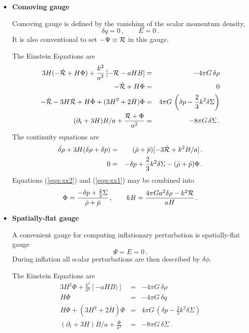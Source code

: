 \documentclass[12pt,letterpaper,rotate]{article}
\def\beq{\begin{equation}}
\def\eeq{\end{equation}}
\begin{document}
{\begin{itemize}
\item {\bf Comoving gauge}

Comoving gauge is defined by the vanishing of the scalar momentum density, 
\beq
\delta q = 0\, , \qquad E =0 \, .
\eeq
It is also conventional to set $- \Psi \equiv {\cal R}$ in this gauge.

The Einstein Equations are
\begin{eqnarray}
3H(- \dot {\cal R} + H \Phi) + \frac{k^2}{a^2} \left[ - {\cal R} - aH B \right] &=& - 4\pi G \, \delta \rho \\
- \dot {\cal R} + H \Phi &=& 0 \label{equ:xx1} \\
- \ddot {\cal R} - 3 H \dot {\cal R} + H \dot \Phi + (3 H^2 + 2 \dot H) \Phi &=& 4 \pi G\, \left( \delta p - \frac{2}{3} k^2 \delta \Sigma \right) \\
(\partial_t + 3 H) B/a + \frac{{\cal R} + \Phi}{a^2}&=& -8 \pi G\, \delta \Sigma\, .
\end{eqnarray}
The continuity equations are
\begin{eqnarray}
\label{equ:con}
\dot{\delta \rho} + 3 H (\delta \rho + \delta p) &=&  (\bar \rho + \bar p) [- 3 \dot {\cal R} + k^2  B/a] \, .\\
0 &=& - \delta p + \frac{2}{3} k^2 \delta \Sigma - (\bar \rho + \bar p) \Phi \, .\label{equ:xx2}
\end{eqnarray}
Equations (\ref{equ:xx2}) and (\ref{equ:xx1}) may be combined into
\beq
\Phi = \frac{- \delta p + \frac{2}{3} \Sigma}{\bar \rho + \bar p}\, , \qquad k B = \frac{4\pi G a^2 \delta \rho - k^2 {\cal R}}{a H}\, .
\eeq

\item {\bf Spatially-flat gauge}

A convenient gauge for computing inflationary perturbation is spatially-flat gauge
\beq
\Psi=E=0\, .
\eeq
During inflation all scalar perturbations are then described by $\delta \phi$.

The Einstein Equations are
\begin{eqnarray}
3H^2 \Phi + \frac{k^2}{a^2} \left[- aH B)\right] &=& - 4\pi G \, \delta \rho \\
 H \Phi &=& - 4\pi G \, \delta q\\
 H \dot \Phi + (3 H^2 + 2 \dot H) \Phi &=& 4 \pi G\, \left( \delta p - \frac{2}{3} k^2 \delta \Sigma \right) \\
(\partial_t + 3 H) B/a + \frac{ \Phi}{a^2}&=& - 8 \pi G\, \delta \Sigma\, .
\end{eqnarray}


\end{itemize}}
\end{document}
